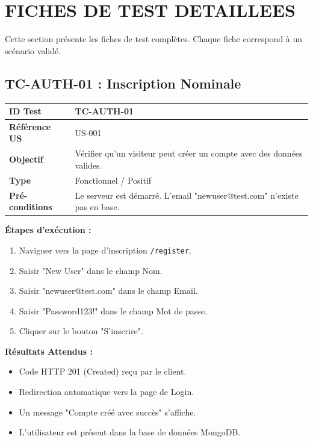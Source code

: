 \documentclass[12pt,a4paper]{article}
\begin{document}
\section{FICHES DE TEST DETAILLEES}

Cette section présente les fiches de test complètes. Chaque fiche correspond à un scénario validé.

\subsection{TC-AUTH-01 : Inscription Nominale}

\begin{tabular}{|l|p{10cm}|}
    \hline
    \textbf{ID Test} & TC-AUTH-01 \\ \hline
    \textbf{Référence US} & US-001 \\ \hline
    \textbf{Objectif} & Vérifier qu'un visiteur peut créer un compte avec des données valides. \\ \hline
    \textbf{Type} & Fonctionnel / Positif \\ \hline
    \textbf{Pré-conditions} & Le serveur est démarré. L'email "newuser@test.com" n'existe pas en base. \\ \hline
\end{tabular}

\vspace{0.5cm}
\textbf{Étapes d'exécution :}
\begin{enumerate}
    \item Naviguer vers la page d'inscription \texttt{/register}.
    \item Saisir "New User" dans le champ Nom.
    \item Saisir "newuser@test.com" dans le champ Email.
    \item Saisir "Password123!" dans le champ Mot de passe.
    \item Cliquer sur le bouton "S'inscrire".
\end{enumerate}

\vspace{0.5cm}
\textbf{Résultats Attendus :}
\begin{itemize}
    \item Code HTTP 201 (Created) reçu par le client.
    \item Redirection automatique vers la page de Login.
    \item Un message "Compte créé avec succès" s'affiche.
    \item L'utilisateur est présent dans la base de données MongoDB.
\end{itemize}
\end{document}
